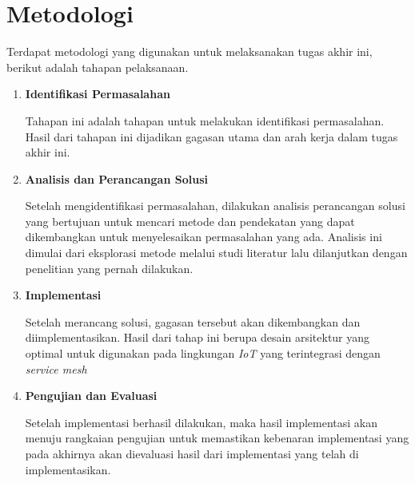 \section{Metodologi}

Terdapat metodologi yang digunakan untuk melaksanakan tugas akhir ini, berikut adalah tahapan pelaksanaan.
\begin{enumerate}
  \item \textbf{Identifikasi Permasalahan}

        Tahapan ini adalah tahapan untuk melakukan identifikasi permasalahan. Hasil dari tahapan ini dijadikan gagasan utama dan arah kerja dalam tugas akhir ini.

  \item \textbf{Analisis dan Perancangan Solusi}

        Setelah mengidentifikasi permasalahan, dilakukan analisis perancangan solusi yang bertujuan untuk mencari metode dan pendekatan yang dapat dikembangkan untuk menyelesaikan permasalahan yang ada. Analisis ini dimulai dari eksplorasi metode melalui studi literatur lalu dilanjutkan dengan penelitian yang pernah dilakukan.

  \item \textbf{Implementasi}

        Setelah merancang solusi, gagasan tersebut akan dikembangkan dan diimplementasikan. Hasil dari tahap ini berupa desain arsitektur yang optimal untuk digunakan pada lingkungan \textit{IoT} yang terintegrasi dengan \textit{service mesh}

  \item \textbf{Pengujian dan Evaluasi}

        Setelah implementasi berhasil dilakukan, maka hasil implementasi akan menuju rangkaian pengujian untuk memastikan kebenaran implementasi yang pada akhirnya akan dievaluasi hasil dari implementasi yang telah di implementasikan.
\end{enumerate}